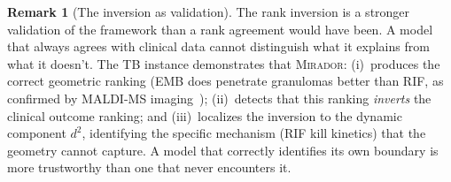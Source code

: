 \documentclass[11pt]{article}
\theoremstyle{plain}
\theoremstyle{definition}
\newtheorem{remark}[theorem]{Remark}
\newcommand{\mirador}{\textsc{Mirador}}
\begin{document}
\begin{remark}[The inversion as validation]
\label{rem:tb-inversion}
The rank inversion is a stronger validation of the framework than
a rank agreement would have been. A model that always agrees with
clinical data cannot distinguish what it explains from what it
doesn't. The TB instance demonstrates that \mirador{}:
(i)~produces the correct geometric ranking (EMB does penetrate
granulomas better than RIF, as confirmed by MALDI-MS
imaging~\cite{Prideaux2015}); (ii)~detects that this ranking
\emph{inverts} the clinical outcome ranking; and (iii)~localizes
the inversion to the dynamic component $d^2$, identifying the
specific mechanism (RIF kill kinetics) that the geometry cannot
capture. A model that correctly identifies its own boundary is
more trustworthy than one that never encounters it.
\end{remark}
\end{document}
